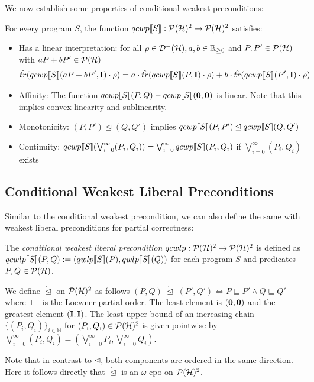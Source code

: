 \documentclass[a4paper,UKenglish,cleveref, autoref, thm-restate]{lipics-v2021}
\begin{document}
We now establish some properties of conditional weakest preconditions:
\begin{proposition} \label{prop:healthcwp}
    For every program $S$, the function $qcwp\llbracket S \rrbracket:\mathcal{P}(\mathcal{H})^2 \to \mathcal{P}(\mathcal{H})^2$ satisfies:
    \begin{itemize}
        \item Has a linear interpretation: for all $\rho \in \mathcal{D}^- (\mathcal{H}), a,b \in \mathbb{R}_{\geq 0}$ and $P,P'\in \mathcal{P}(\mathcal{H})$ with $aP+bP' \in \mathcal{P}(\mathcal{H})$
        \begin{align*}
            \hat{tr}(qcwp\llbracket S \rrbracket (aP+bP',\textbf{I}) \cdot \rho) = a \cdot \hat{tr}(qcwp\llbracket S \rrbracket (P,\textbf{I})\cdot \rho) + b\cdot\hat{tr}(qcwp\llbracket S \rrbracket (P',\textbf{I}) \cdot\rho)
        \end{align*}
        \item Affinity: The function $qcwp\llbracket S \rrbracket (P,Q) - qcwp\llbracket S \rrbracket (\mathbf{0},\mathbf{0})$ is linear. Note that this implies convex-linearity and sublinearity.
        \item Monotonicity: $(P,P')\unlhd (Q,Q')$ implies $qcwp\llbracket S \rrbracket (P,P')\unlhd qcwp\llbracket S \rrbracket (Q,Q')$
        \item Continuity: $qcwp\llbracket S \rrbracket (\bigvee_{i=0}^\infty (P_i,Q_i)) = \bigvee_{i=0}^\infty qcwp\llbracket S \rrbracket (P_i,Q_i)$ if $\bigvee_{i=0}^\infty (P_i,Q_i)$ exists
    \end{itemize}
\end{proposition}

\subsection{Conditional Weakest Liberal Preconditions}
Similar to the conditional weakest precondition, we can also define the same with weakest liberal preconditions for partial correctness:
\begin{definition}
    The \emph{conditional weakest liberal precondition} $qcwlp:\mathcal{P}(\mathcal{H})^2\to \mathcal{P}(\mathcal{H})^2$ is defined as $qcwlp\llbracket S \rrbracket (P,Q):= (qwlp\llbracket S \rrbracket (P), qwlp\llbracket S \rrbracket (Q))$ for each program $S$ and predicates $P,Q \in \mathcal{P}(\mathcal{H})$.
\end{definition}
\begin{definition} We define $\dot \unlhd$ on $\mathcal{P}(\mathcal{H})^2$ as follows $
        (P,Q) \phantom{.}\dot \unlhd \phantom{.} (P',Q') \Leftrightarrow P \sqsubseteq P' \land Q \sqsubseteq Q'$
    where $\sqsubseteq$ is the Loewner partial order. The least element is $(\mathbf{0},\mathbf{0})$ and the greatest element $(\textbf{I},\textbf{I})$.
    The least upper bound of an increasing chain $\{(P_i,Q_i)\}_{i\in \mathbb{N}}$ for $(P_i,Q_i)\in \mathcal{P}(\mathcal{H})^2$ is given pointwise by $
        \bigvee_{i=0}^\infty (P_i,Q_i) = (\bigvee_{i=0}^\infty P_i ,\bigvee_{i=0}^\infty Q_i)$.
\end{definition}
Note that in contrast to $\unlhd$, both components are ordered in the same direction. Here it follows directly that $\dot \unlhd$ is an $\omega$-cpo on $\mathcal{P}(\mathcal{H})^2$.
\end{document}
